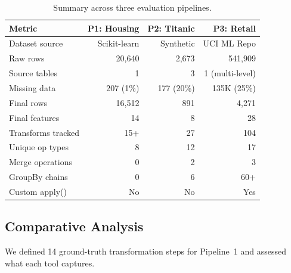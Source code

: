 \documentclass[10pt,twocolumn]{article}
\begin{document}
\begin{table}[t]
\centering
\caption{Summary across three evaluation pipelines.}
\label{tab:pipeline_summary}
\small
\begin{tabular}{@{}lrrr@{}}
\toprule
\textbf{Metric} & \textbf{P1: Housing} & \textbf{P2: Titanic} & \textbf{P3: Retail} \\
\midrule
Dataset source & Scikit-learn & Synthetic & UCI ML Repo \\
Raw rows & 20,640 & 2,673 & 541,909 \\
Source tables & 1 & 3 & 1 (multi-level) \\
Missing data & 207 (1\%) & 177 (20\%) & 135K (25\%) \\
Final rows & 16,512 & 891 & 4,271 \\
Final features & 14 & 8 & 28 \\
Transforms tracked & 15+ & 27 & 104 \\
Unique op types & 8 & 12 & 17 \\
Merge operations & 0 & 2 & 3 \\
GroupBy chains & 0 & 6 & 60+ \\
Custom apply() & No & No & Yes \\
\bottomrule
\end{tabular}
\end{table}

\subsection{Comparative Analysis}
\label{sec:comparative}

We defined 14 ground-truth transformation steps for Pipeline~1 and assessed what each tool captures.
\end{document}
